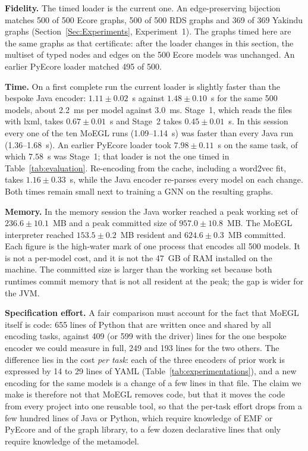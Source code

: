 \documentclass[journal,article,submit,moreauthors,technologies]{Definitions/mdpi}
\newcommand{\rev}[1]{#1}
\begin{document}
\rev{\textbf{Fidelity.} The timed loader is the current one. An edge-preserving bijection matches 500 of 500 Ecore graphs, 500 of 500 RDS graphs and 369 of 369 Yakindu graphs (Section~\ref{Sec:Experiments}, Experiment~1). The graphs timed here are the same graphs as that certificate: after the loader changes in this section, the multiset of typed nodes and edges on the 500 Ecore models was unchanged. An earlier PyEcore loader matched 495 of 500.}

\rev{\textbf{Time.} On a first complete run the current loader is slightly faster than the bespoke Java encoder: $1.11 \pm 0.02$~s against $1.48 \pm 0.10$~s for the same 500 models, about 2.2~ms per model against 3.0~ms. Stage~1, which reads the files with lxml, takes $0.67 \pm 0.01$~s and Stage~2 takes $0.45 \pm 0.01$~s. In this session every one of the ten MoEGL runs (1.09--1.14~s) was faster than every Java run (1.36--1.68~s). An earlier PyEcore loader took $7.98 \pm 0.11$~s on the same task, of which $7.58$~s was Stage~1; that loader is not the one timed in Table~\ref{tab:evaluation}. Re-encoding from the cache, including a word2vec fit, takes $1.16 \pm 0.33$~s, while the Java encoder re-parses every model on each change. Both times remain small next to training a GNN on the resulting graphs.}

\rev{\textbf{Memory.} In the memory session the Java worker reached a peak working set of $236.6 \pm 10.1$~MB and a peak committed size of $957.0 \pm 10.8$~MB. The MoEGL interpreter reached $153.5 \pm 0.2$~MB resident and $624.6 \pm 0.3$~MB committed. Each figure is the high-water mark of one process that encodes all 500 models. It is not a per-model cost, and it is not the 47~GB of RAM installed on the machine. The committed size is larger than the working set because both runtimes commit memory that is not all resident at the peak; the gap is wider for the JVM.}

\rev{\textbf{Specification effort.} A fair comparison must account for the fact that MoEGL itself is code: 655 lines of Python that are written once and shared by all encoding tasks, against 409 (or 599 with the driver) lines for the one bespoke encoder we could measure in full, 249 and 193 lines for the two others. The difference lies in the cost \emph{per task}: each of the three encoders of prior work is expressed by 14 to 29 lines of YAML (Table~\ref{tab:experimentations}), and a new encoding for the same models is a change of a few lines in that file. The claim we make is therefore not that MoEGL removes code, but that it moves the code from every project into one reusable tool, so that the per-task effort drops from a few hundred lines of Java or Python, which require knowledge of EMF or PyEcore and of the graph library, to a few dozen declarative lines that only require knowledge of the metamodel.}
\end{document}
